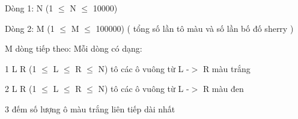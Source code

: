 Dòng 1: N (1  $\le$  N  $\le$  10000)  

   Dòng 2: M (1  $\le$  M  $\le$  100000) ( tổng số lần tô màu và số lần bố đố sherry )  

   M dòng tiếp theo: Mỗi dòng có dạng:  

   1  L  R  (1  $\le$  L  $\le$  R  $\le$  N) tô các ô vuông từ L -$>$ R màu trắng  

   2  L  R  (1  $\le$  L  $\le$  R  $\le$  N) tô các ô vuông từ L -$>$ R màu đen  

   3 đếm số lượng ô màu trắng liên tiếp dài nhất  

\